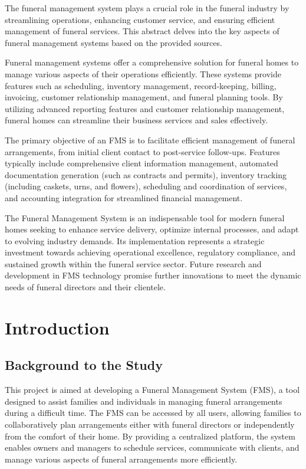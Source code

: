 \documentclass[a4paper,12pt]{report}
\begin{document}
\vspace{1cm}

The funeral management system plays a crucial role in the funeral industry by streamlining operations, enhancing customer service, and ensuring efficient management of funeral services. This abstract delves into the key aspects of funeral management systems based on the provided sources.

Funeral management systems offer a comprehensive solution for funeral homes to manage various aspects of their operations efficiently. These systems provide features such as scheduling, inventory management, record-keeping, billing, invoicing, customer relationship management, and funeral planning tools. By utilizing advanced reporting features and customer relationship management, funeral homes can streamline their business services and sales effectively.

The primary objective of an FMS is to facilitate efficient management of funeral arrangements, from initial client contact to post-service follow-ups. Features typically include comprehensive client information management, automated documentation generation (such as contracts and permits), inventory tracking (including caskets, urns, and flowers), scheduling and coordination of services, and accounting integration for streamlined financial management.

The Funeral Management System is an indispensable tool for modern funeral homes seeking to enhance service delivery, optimize internal processes, and adapt to evolving industry demands. Its implementation represents a strategic investment towards achieving operational excellence, regulatory compliance, and sustained growth within the funeral service sector. Future research and development in FMS technology promise further innovations to meet the dynamic needs of funeral directors and their clientele.

\vfill
\newpage

\newpage
\chapter{Introduction}

\section{Background to the Study}
This project is aimed at developing a Funeral Management System (FMS), a tool designed to assist families and individuals in managing funeral arrangements during a difficult time. The FMS can be accessed by all users, allowing families to collaboratively plan arrangements either with funeral directors or independently from the comfort of their home. By providing a centralized platform, the system enables owners and managers to schedule services, communicate with clients, and manage various aspects of funeral arrangements more efficiently.
\end{document}

